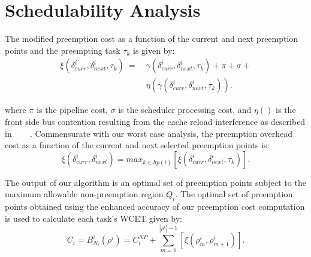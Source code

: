 \section{Schedulability Analysis}\label{sec:schedulability_analysis}

The modified preemption cost as a function of the current and next preemption points and the preempting task \begin{math}\tau_{k}\end{math} is given by:
\begin{equation}\label{eqn:prempt-cost}
\begin{split}
    \xi(\delta_{curr}^{i},\delta_{next}^{i},\tau_{k})\ =\ &\gamma(\delta_{curr}^{i},\delta_{next}^{i},\tau_{k}) + \pi + \sigma + \\ &\eta(\gamma(\delta_{curr}^{i},\delta_{next}^{i},\tau_{k})).
\end{split}
\end{equation}

 \noindent
 where \begin{math}\pi\end{math} is the pipeline cost, \begin{math}\sigma\end{math} is the scheduler processing cost, and \begin{math}\eta()\end{math} is the front side bus contention resulting from the cache reload interference as described in~\cite{pellizzoni:07} ~\cite{pellizzoni:08} ~\cite{pellizzoni:11}.  Commensurate with our worst case analysis, the preemption overhead cost as a function of the current and next selected preemption points is:
\begin{equation}\label{eqn:prempt-cost}
    \xi(\delta_{curr}^{i},\delta_{next}^{i}) = \textit{max}_{k \in hp(i)} [ \xi(\delta_{curr}^{i},\delta_{next}^{i},\tau_{k})].
\end{equation}

The output of our algorithm is an optimal set of preemption points subject to the maximum allowable non-preemption region \begin{math}Q_{i}\end{math}.  The optimal set of preemption points obtained using the enhanced accuracy of our preemption cost computation is used to calculate each task's WCET given by:
\begin{equation}\label{eqn:wcet-cost}
   C_{i} = B_{N_{i}}^{i}(\rho^{i}) = C_{i}^{NP} + \sum_{m=1}^{|\rho^{i}|-1} [\xi(\rho_{m}^{i},\rho_{m+1}^{i})].
\end{equation}

